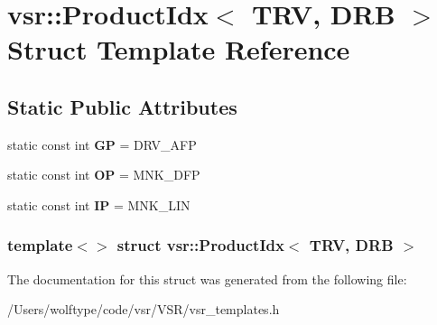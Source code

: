 \hypertarget{structvsr_1_1_product_idx_3_01_t_r_v_00_01_d_r_b_01_4}{\section{vsr\-:\-:Product\-Idx$<$ T\-R\-V, D\-R\-B $>$ Struct Template Reference}
\label{structvsr_1_1_product_idx_3_01_t_r_v_00_01_d_r_b_01_4}
}
\subsection*{Static Public Attributes}
\begin{DoxyCompactItemize}
\item 
\hypertarget{structvsr_1_1_product_idx_3_01_t_r_v_00_01_d_r_b_01_4_ac0cda7fcbb5f4168a904c259a3880ae8}{static const int {\bfseries G\-P} = D\-R\-V\-\_\-\-A\-F\-P}\label{structvsr_1_1_product_idx_3_01_t_r_v_00_01_d_r_b_01_4_ac0cda7fcbb5f4168a904c259a3880ae8}

\item 
\hypertarget{structvsr_1_1_product_idx_3_01_t_r_v_00_01_d_r_b_01_4_a821f051598f502b241f0169757b4502a}{static const int {\bfseries O\-P} = M\-N\-K\-\_\-\-D\-F\-P}\label{structvsr_1_1_product_idx_3_01_t_r_v_00_01_d_r_b_01_4_a821f051598f502b241f0169757b4502a}

\item 
\hypertarget{structvsr_1_1_product_idx_3_01_t_r_v_00_01_d_r_b_01_4_aeb44ed8b6fce2d978603a8124a01e399}{static const int {\bfseries I\-P} = M\-N\-K\-\_\-\-L\-I\-N}\label{structvsr_1_1_product_idx_3_01_t_r_v_00_01_d_r_b_01_4_aeb44ed8b6fce2d978603a8124a01e399}

\end{DoxyCompactItemize}
\subsubsection*{template$<$$>$ struct vsr\-::\-Product\-Idx$<$ T\-R\-V, D\-R\-B $>$}



The documentation for this struct was generated from the following file\-:\begin{DoxyCompactItemize}
\item 
/\-Users/wolftype/code/vsr/\-V\-S\-R/vsr\-\_\-templates.\-h\end{DoxyCompactItemize}
